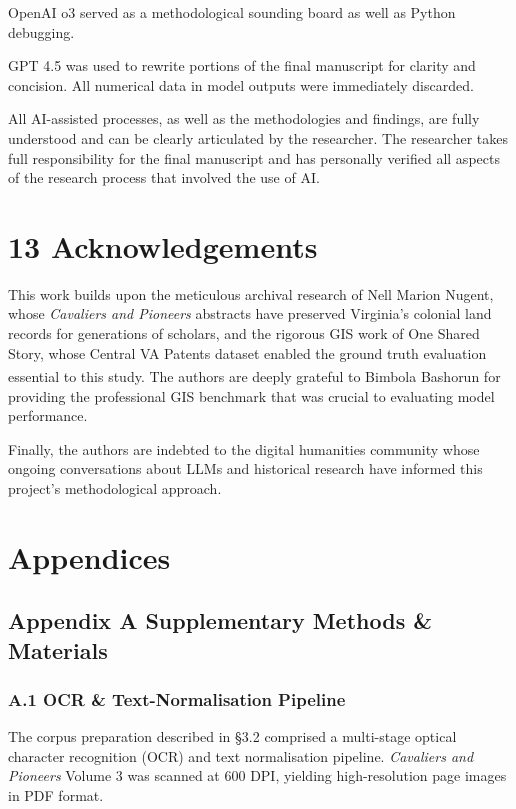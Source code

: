 \documentclass[
  10pt]{article}
\begin{document}
OpenAI o3 served as a methodological sounding board as well as Python
debugging.

GPT 4.5 was used to rewrite portions of the final manuscript for clarity
and concision. All numerical data in model outputs were immediately
discarded.

All AI-assisted processes, as well as the methodologies and findings,
are fully understood and can be clearly articulated by the researcher.
The researcher takes full responsibility for the final manuscript and
has personally verified all aspects of the research process that
involved the use of AI.

\section{13 Acknowledgements}\label{acknowledgements}

This work builds upon the meticulous archival research of Nell Marion
Nugent, whose \emph{Cavaliers and Pioneers} abstracts have preserved
Virginia's colonial land records for generations of scholars, and the
rigorous GIS work of One Shared Story, whose Central VA Patents dataset
enabled the ground truth evaluation essential to this study. The authors
are deeply grateful to Bimbola
Bashorun\textsuperscript{} for
providing the professional GIS benchmark that was crucial to evaluating
model performance.

Finally, the authors are indebted to the digital humanities community
whose ongoing conversations about LLMs and historical research have
informed this project's methodological approach.

\onecolumn
\section{Appendices}\label{appendices}

\subsection{Appendix A Supplementary Methods \&
Materials}\label{appendix-a-supplementary-methods-materials}

\subsubsection{A.1 OCR \& Text-Normalisation
Pipeline}\label{a.1-ocr-text-normalisation-pipeline}

The corpus preparation described in §3.2 comprised a multi-stage optical
character recognition (OCR) and text normalisation pipeline.
\emph{Cavaliers and Pioneers} Volume 3 was scanned at 600 DPI, yielding
high-resolution page images in PDF format.
\end{document}
